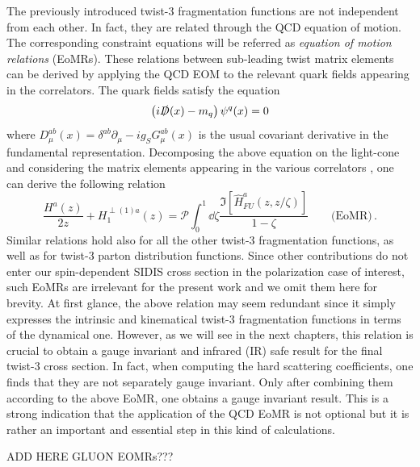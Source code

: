 The previously introduced twist-3 fragmentation functions are not independent from each other. In fact, they are related through the QCD equation of motion. The corresponding constraint equations will be referred as \textit{equation of motion relations} (EoMRs). These relations between sub-leading twist matrix elements can be derived by applying the QCD EOM to the relevant quark fields appearing in the correlators. The quark fields satisfy the equation
\begin{equation}
    \left(i \slashed{D}(x) -m_q \right)\psi^q(x)=0
\end{equation}
where $D_\mu^{ab}(x)=\delta^{ab}\partial_\mu -ig_S G_\mu^{ab}(x)$ is the usual covariant derivative in the fundamental representation. Decomposing the above equation on the light-cone and considering the matrix elements appearing in the various correlators \cite{bacchetta_semi-inclusive_2007}, one can derive the following relation \cite{kanazawa_operator_2016}
\begin{equation}\label{eq:eomr H}
    \frac{H^a(z)}{2 z}+H_1^{\perp(1)a}(z)= \mathcal{P}\int_0^1\dd \zeta\frac{\Im[\hat H^a_{FU}(z,z/\zeta)]}{1-\zeta}\qquad \text{(EoMR)}\,.
\end{equation}
Similar relations hold also for all the other twist-3 fragmentation functions, as well as for twist-3 parton distribution functions. Since other contributions do not enter our spin-dependent SIDIS cross section in the polarization case of interest, such EoMRs are irrelevant for the present work and we omit them here for brevity. At first glance, the above relation may seem redundant since it simply expresses the intrinsic and kinematical twist-3 fragmentation functions in terms of the dynamical one. However, as we will see in the next chapters, this relation is crucial to obtain a gauge invariant and infrared (IR) safe result for the final twist-3 cross section. In fact, when computing the hard scattering coefficients, one finds that they are not separately gauge invariant. Only after combining them according to the above EoMR, one obtains a gauge invariant result. This is a strong indication that the application of the QCD EoMR is not optional but it is rather an important and essential step in this kind of calculations.

\noindent ADD HERE GLUON EOMRs???\\

